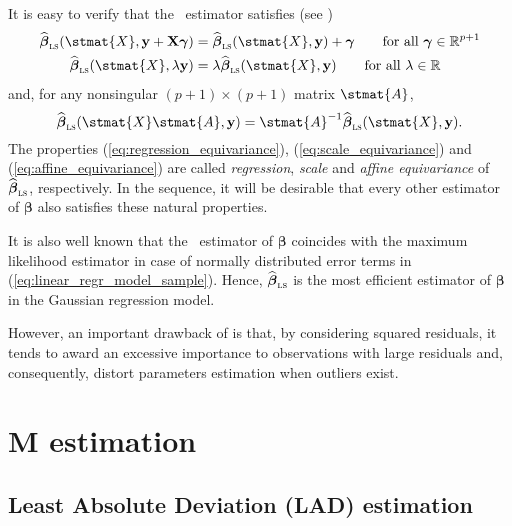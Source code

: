 It is easy to verify that the ~estimator satisfies 
(see \citealp[92]{maronna:etal:2006})
%
\begin{align}
    \label{eq:regression_equivariance}
    \sthat{\boldsymbol\beta}_\stsc{LS}(\stmat{X},\stvec{y}+\mathbf{X}\boldsymbol\gamma) 
        &= \sthat{\boldsymbol\beta}_\stsc{LS}(\stmat{X},\stvec{y})+\boldsymbol\gamma
        \qquad\text{for all $\boldsymbol\gamma\in\mathbb{R}^{p+1}$} \\
    \label{eq:scale_equivariance}
    \sthat{\boldsymbol\beta}_\stsc{LS}(\stmat{X},\lambda\stvec{y})
        &= \lambda\sthat{\boldsymbol\beta}_\stsc{LS}(\stmat{X}, \stvec{y})
        \qquad\text{for all $\lambda\in\mathbb{R}$}
\end{align}
%
and, for any nonsingular $(p+1) \times (p+1)$ matrix $\stmat{A}$,
%
\begin{equation}\label{eq:affine_equivariance}
    \sthat{\boldsymbol\beta}_\stsc{LS}(\stmat{X}\stmat{A},\stvec{y})
    = \stmat{A}^{-1}\sthat{\boldsymbol\beta}_\stsc{LS}(\stmat{X},\stvec{y}).
\end{equation}
%
The properties (\ref{eq:regression_equivariance}),
(\ref{eq:scale_equivariance}) and (\ref{eq:affine_equivariance}) are called
\emph{regression}, \emph{scale} and \emph{affine equivariance} of
$\sthat{\boldsymbol\beta}_\stsc{LS}$, respectively. In the sequence, it will
be desirable that every other estimator of $\boldsymbol\beta$ also satisfies
these natural properties.

It is also well known that the ~estimator of $\boldsymbol\beta$ coincides
with the maximum likelihood estimator in case of normally distributed error
terms in (\ref{eq:linear_regr_model_sample}). Hence, $\widehat
{\boldsymbol\beta}_\stsc{LS}$ is the most efficient estimator of
$\boldsymbol\beta$ in the Gaussian regression model.

However, an important drawback of  is that, by considering squared
residuals, it tends to award an excessive importance to observations with large
residuals and, consequently, distort parameters estimation when outliers exist.

\section{M estimation}

\subsection{Least Absolute Deviation (LAD) estimation}

